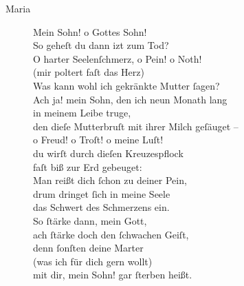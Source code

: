 \documentclass[parskip=full]{scrreprt}
\newif\iftemplate\templatetrue
\begin{document}
\begin{description}
	\item[Maria]
	Mein Sohn! o Gottes Sohn!\\
	So geheſt du dann izt zum Tod?\\
	O harter Seelenſchmerz, o Pein! o Noth!\\
	(mir poltert faſt das Herz)\\
	Was kann wohl ich gekränkte Mutter ſagen?\\
	Ach ja! mein Sohn, den ich neun Monath lang\\
	in meinem Leibe truge,\\
	den dieſe Mutterbruſt mit ihrer Milch geſäuget –\\
	o Freud! o Troſt! o meine Luſt!\\
	du wirſt durch dieſen Kreuzespflock\\
	faſt biß zur Erd gebeuget:\\
	Man reißt dich ſchon zu deiner Pein,\\
	drum dringet ſich in meine Seele\\
	das Schwert des Schmerzens ein.\\
	So ſtärke dann, mein Gott,\\
	ach ſtärke doch den ſchwachen Geiſt,\\
	denn ſonſten deine Marter\\
	(was ich für dich gern wollt)\\
	mit dir, mein Sohn! gar ſterben heißt.
\end{description}

\cleardoublepage
\fi

\iftemplate

\fi
\end{document}
